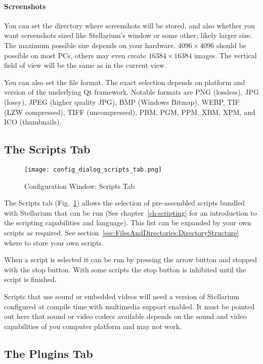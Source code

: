 \paragraph{Screenshots} You can set the directory where screenshots
will be stored, and  also whether you want
screenshots sized like Stellarium's window or some other, likely
larger size. The maximum possible size depends on your
hardware. $4096\times4096$ should be possible on most PCs, others may
even create $16384\times16384$ images. The vertical field of view will be the same as in the current view.

You can also set  the file format. The exact selection depends on
platform and version of the underlying Qt framework. Notable formats are PNG (lossless), JPG (lossy),
JPEG (higher quality JPG), BMP (Windows Bitmap), WEBP, TIF (LZW compressed), TIFF (uncompressed),
PBM, PGM, PPM, XBM, XPM, and ICO (thumbnails).


\subsection{The Scripts Tab}
\label{sec:gui:configuration:scripts}

\begin{figure}[htbp]
\centering\texttt{[image: config\_dialog\_scripts\_tab.png]}
\caption{Configuration Window: Scripts Tab}
\label{fig:gui:configuration:scripts}
\end{figure}

The Scripts tab (Fig.~\ref{fig:gui:configuration:scripts}) allows the
selection of pre-assembled scripts bundled with Stellarium that can be
run (See chapter~\ref{ch:scripting} for an introduction to the
scripting capabilities and language). This list can be expanded by
your own scripts as required. See
section~\ref{sec:FilesAndDirectories:DirectoryStructure} where to
store your own scripts.

When a script is selected it can be run by pressing the arrow button
and stopped with the stop button. With some scripts the stop button is
inhibited until the script is finished. %

Scripts that use sound or embedded videos will need a version of
Stellarium configured at compile time with multimedia support
enabled. It must be pointed out here that sound or video codecs
available depends on the sound and video capabilities of you computer
platform and may not work.


\subsection{The Plugins Tab}
\label{sec:gui:configuration:plugins}

